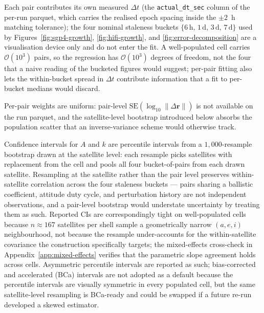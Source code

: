 \documentclass[10pt, letterpaper]{article}
\begin{document}
Each pair contributes its own measured $\Delta t$ (the
\texttt{actual\_dt\_sec} column of the per-run parquet, which carries
the realised epoch spacing inside the $\pm 2$~h matching tolerance);
the four nominal staleness buckets $\{6\,\text{h},\,1\,\text{d},\,
3\,\text{d},\,7\,\text{d}\}$ used by
Figures~\ref{fig:sgp4-growth}, \ref{fig:hifi-growth}, and
\ref{fig:error-decomposition} are a visualisation device only and do
not enter the fit. A well-populated cell carries
$\mathcal{O}(10^{3})$ pairs, so the regression has $\mathcal{O}(10^{3})$
degrees of freedom, not the four that a naive reading of the
bucketed figures would suggest; per-pair fitting also lets the
within-bucket spread in $\Delta t$ contribute information that a fit
to per-bucket medians would discard.

Per-pair weights are uniform: pair-level
$\mathrm{SE}(\log_{10}\lVert\Delta\mathbf{r}\rVert)$ is
not available on the run parquet, and the satellite-level bootstrap
introduced below absorbs the population scatter that an
inverse-variance scheme would otherwise track.

Confidence intervals for $A$ and $k$ are percentile intervals from a
$1{,}000$-resample bootstrap drawn at the satellite level: each
resample picks satellites with replacement from the cell and pools
all four bucket-of-pairs from each drawn satellite. Resampling at
the satellite rather than the pair level preserves within-satellite
correlation across the four staleness buckets --- pairs sharing a
ballistic coefficient, attitude duty cycle, and perturbation history
are not independent observations, and a pair-level bootstrap would
understate uncertainty by treating them as such. Reported CIs are
correspondingly tight on well-populated cells because $n \approx 167$
satellites per shell sample a geometrically narrow $(a, e, i)$
neighbourhood, not because the resample under-accounts for the
within-satellite covariance the construction specifically targets;
the mixed-effects cross-check in Appendix~\ref{app:mixed-effects}
verifies that the parametric slope agreement holds across cells. Asymmetric
percentile intervals are reported as such; bias-corrected and
accelerated (BCa) intervals are not adopted as a default because the
percentile intervals are visually symmetric in every populated cell,
but the same satellite-level resampling is BCa-ready and could be
swapped if a future re-run developed a skewed estimator.
\end{document}
